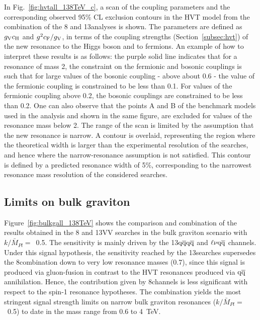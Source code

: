 In Fig.~\ref{fig:hvtall_138TeV_c}, a scan of the coupling parameters and the corresponding observed 95\% CL exclusion contours in the HVT model from the combination of the 8 and 13\TeV analyses is shown. The parameters are defined as $g_{\rm V}c_{\rm H}$ and $g^2c_{\rm F}/g_{\rm V}$, in terms of the coupling strengths (Section~\ref{subsec:hvt}) of the new resonance to the Higgs boson and to fermions.
An example of how to interpret these results is as follows:
the purple solid line indicates that for a resonance of mass 2\TeV, the constraint on the fermionic and bosonic couplings is such that for large values of the bosonic coupling - above about 0.6 - the value of the fermionic coupling is constrained to be less than 0.1. For values of the fermionic coupling above 0.2, the bosonic couplings are constrained to be less than 0.2.
One can also observe that the points A and B of the benchmark models used in the analysis and shown in the same figure, are excluded for values of the resonance mass below 2\TeV.
The range of the scan is limited by the assumption that the new resonance is narrow. A contour is overlaid, representing the region where the theoretical width is larger than the experimental resolution of the searches, and hence where the narrow-resonance assumption is not satisfied. This contour is defined by a predicted resonance width of 5\%, corresponding to the narrowest resonance mass resolution of the considered searches.

\subsection{Limits on bulk graviton}

Figure~\ref{fig:bulkgall_138TeV} shows the comparison and combination of the results obtained in the 8 and 13\TeV VV searches in the bulk graviton scenario with $k/\bar{M}_{Pl}=$~0.5.
The sensitivity is mainly driven by the 13\TeV $\mathrm{q}\overline{\mathrm{q}} \mathrm{q}\overline{\mathrm{q}}$ and $\ell \nu \mathrm{q}\overline{\mathrm{q}}$ channels.
Under this signal hypothesis, the sensitivity reached by the 13\TeV searches supersedes the 8\TeV combination down to very low resonance masses (0.7\TeV), since this signal is produced via gluon-fusion in contrast to the HVT resonances produced via $\mathrm{q}\overline{\mathrm{q}}$ annihilation.
Hence, the contribution given by 8\TeV channels is less significant with respect to the spin-1 resonance hypotheses.
The combination yields the most stringent signal strength limits on narrow bulk graviton resonances ($k/\bar{M}_{Pl}=$~0.5) to date in the mass range from 0.6 to 4~TeV.

